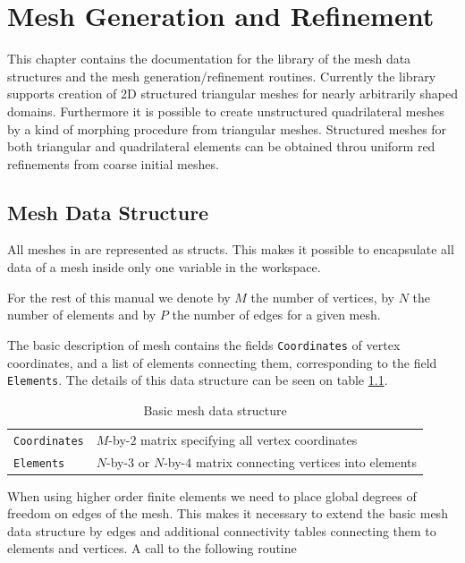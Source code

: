 
\chapter{Mesh Generation and Refinement}

This chapter contains the documentation for the \MATLAB library \LIBNAME of the mesh data structures and the mesh
generation/refinement routines. Currently the library supports creation of 2D structured triangular meshes for nearly
arbitrarily shaped domains. Furthermore it is possible to create unstructured quadrilateral meshes by a kind of morphing
procedure from triangular meshes. Structured meshes for both triangular and quadrilateral elements can be obtained throu
uniform red refinements from coarse initial meshes.

\section{Mesh Data Structure}
\label{sect:MDS}

All meshes in \LIBNAME are represented as \MATLAB structs. This makes it possible to encapsulate all data of a mesh
inside only one variable in the workspace.

For the rest of this manual we denote by $M$ the number of vertices, by $N$ the number of elements and by $P$ the
number of edges for a given mesh.

The basic description of mesh contains the fields {\tt Coordinates} of vertex coordinates, and a list of elements
connecting them, corresponding to the field {\tt Elements}. The details of this data structure can be seen on table
\ref{tab:MSH_B}.

\begin{table}[htb]
  \begin{tabular}{p{2cm}p{9cm}}
    {\tt Coordinates} & {\small $M$-by-$2$ matrix specifying all vertex coordinates} \\
    {\tt Elements}    & {\small $N$-by-$3$ or $N$-by-$4$ matrix connecting vertices into elements}
  \end{tabular}
  \caption{Basic mesh data structure}
  \label{tab:MSH_B}
\end{table}

When using higher order finite elements we need to place global degrees of freedom on edges of the mesh. This makes
it necessary to extend the basic mesh data structure by edges and additional connectivity tables connecting them to
elements and vertices. A call to the following routine \\

